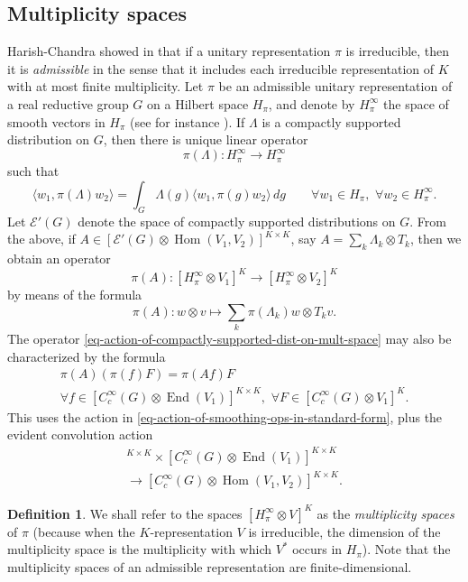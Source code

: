 \documentclass[leqno,11pt]{amsart}
\numberwithin{equation}{subsection}
\theoremstyle{plain}
\theoremstyle{definition}
\newtheorem{definition}[equation]{Definition}
\theoremstyle{remark}
\DeclareMathOperator{\Hom}{Hom}
\DeclareMathOperator{\End}{End}
\begin{document}
\subsection{Multiplicity spaces} 
Harish-Chandra showed in \cite[Thm.\,6]{HarishChandra53} that if a unitary representation $\pi$ is irreducible, then it is   \emph{admissible} in the sense that it includes each irreducible representation of $K$ with at most finite multiplicity.  Let $\pi$ be an admissible  unitary  representation  of a real reductive group $G$ on a Hilbert space $H_\pi$, and denote by $H^\infty _\pi$ the space of smooth vectors in $H_\pi$ (see for instance \cite[Ch.\ III]{KnappOverview}).  If $\Lambda$ is a compactly supported distribution on $G$, then there is unique linear   operator 
\[
\pi(\Lambda) \colon H^\infty _\pi \longrightarrow H^\infty _\pi 
\]
such that 
\[
\langle w_1 ,\pi(\Lambda) w_2\rangle = \int_G \Lambda (g) \langle w_1, \pi(g) w_2\rangle\, dg  \qquad \forall w_1\in H_\pi ,\,\, \forall w_2 \in H^\infty _\pi.
\]
Let $\mathcal{E}'(G)$ denote the space of compactly supported distributions on $G$. From the above, if $A \in [ \mathcal{E}'(G) \otimes \Hom(V_1,V_2)]^{K\times K}$, say $A = \sum_k \Lambda_k \otimes T_k$, then we obtain an operator 
\begin{equation}
    \label{eq-action-of-compactly-supported-dist-on-mult-space}
\pi(A) \colon [ H^\infty _\pi\otimes V_1]^K \longrightarrow [ H^\infty _\pi \otimes V_2] ^K
\end{equation}
by means of the formula 
\[
\pi(A) \colon  w\otimes v \longmapsto \sum_k \pi(\Lambda_k)w\otimes T_k v .
\]
The operator \eqref{eq-action-of-compactly-supported-dist-on-mult-space} may also be characterized by the formula 
\begin{multline}
    \label{eq-action-of-compactly-supported-dist-on-mult-space2}
\pi(A) (\pi(f) F) = \pi(Af)F
\\
\forall f \in [C_c^\infty(G)\otimes \End (V_1)]^{K\times K},\,\, \forall F \in [C_c^\infty (G) \otimes V_1]^K .
\end{multline}
This uses the action in \eqref{eq-action-of-smoothing-ops-in-standard-form}, plus the evident convolution action 
\begin{multline*}
[ \mathcal{E}'(G) \otimes \Hom(V_1,V_2)]^{K\times K} \times  [C_c^\infty(G)\otimes \End (V_1)]^{K\times K} 
\\
\longrightarrow  [C_c^\infty(G)\otimes \Hom (V_1,V_2)]^{K\times K}.
\end{multline*}

\begin{definition}
We shall refer to the spaces $[H^\infty _\pi \otimes V]^K$ as the \emph{multiplicity spaces} of $\pi$ (because when the $K$-representation $V$ is irreducible, the dimension of the multiplicity space is the multiplicity with which $V^*$ occurs in $H_\pi$).  Note that the multiplicity spaces of an admissible representation are finite-dimensional.
\end{definition}
\end{document}
